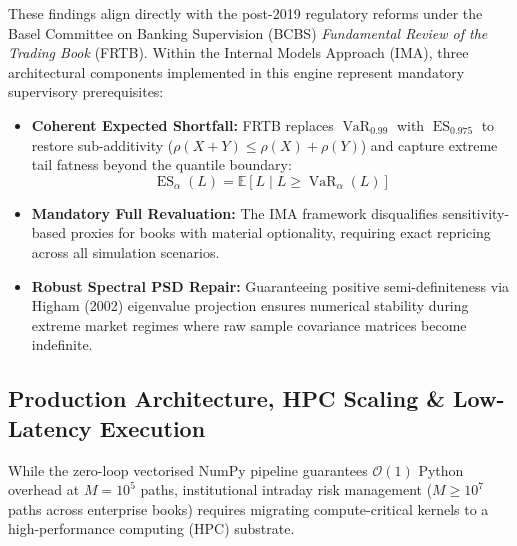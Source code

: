 \documentclass{article}
\theoremstyle{plain}
\theoremstyle{definition}
\theoremstyle{remark}
\DeclareMathOperator{\VaR}{VaR}
\DeclareMathOperator{\ES}{ES}
\begin{document}
These findings align directly with the post-2019 regulatory reforms under the Basel Committee on Banking Supervision (BCBS) \textit{Fundamental Review of the Trading Book} (FRTB). Within the Internal Models Approach (IMA), three architectural components implemented in this engine represent mandatory supervisory prerequisites:
\begin{itemize}
    \item \textbf{Coherent Expected Shortfall:} FRTB replaces $\VaR_{0.99}$ with $\ES_{0.975}$ to restore sub-additivity ($\rho(X+Y) \le \rho(X) + \rho(Y)$) and capture extreme tail fatness beyond the quantile boundary:
    \begin{equation}
        \ES_\alpha(L) = \mathbb{E}\left[L \mid L \ge \VaR_\alpha(L)\right]
    \end{equation}
    \item \textbf{Mandatory Full Revaluation:} The IMA framework disqualifies sensitivity-based proxies for books with material optionality, requiring exact repricing across all simulation scenarios.
    \item \textbf{Robust Spectral PSD Repair:} Guaranteeing positive semi-definiteness via Higham (2002) eigenvalue projection ensures numerical stability during extreme market regimes where raw sample covariance matrices become indefinite.
\end{itemize}

\subsection{Production Architecture, HPC Scaling \& Low-Latency Execution}
\label{sec:ch5_hpc}
While the zero-loop vectorised NumPy pipeline guarantees $\mathcal{O}(1)$ Python overhead at $M = 10^5$ paths, institutional intraday risk management ($M \ge 10^7$ paths across enterprise books) requires migrating compute-critical kernels to a high-performance computing (HPC) substrate.
\end{document}
